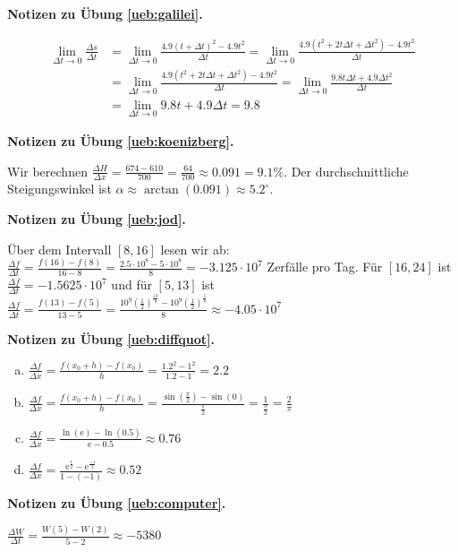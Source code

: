 \documentclass[%
11pt,%
twoside,%
titlepage,%
german,%
headsepline%
]{scrartcl}
\theoremstyle{definition}
\theoremstyle{plain}
\newcommand{\concatueb}[1]{ueb:#1}%
\newcommand{\concatlsg}[1]{lsg:#1}%
\newenvironment{lsg}[1]{%
    \par\noindent\textbf{Notizen zu Übung \ref{\concatueb{#1}}.}%
    \label{\concatlsg{#1}}
}{%
    \par%
}
\begin{document}
\begin{lsg}{galilei}
\begin{align*}
    \lim_{\Delta t\to0}\frac{\Delta s}{\Delta t} &= \lim_{\Delta t\to0}\frac{4.9(t+\Delta t)^2-4.9t^2}{\Delta t}=\lim_{\Delta t\to0}\frac{4.9(t^2+2t\Delta t+\Delta t^2)-4.9t^2}{\Delta t}\\
    &= \lim_{\Delta t\to0}\frac{4.9(t^2+2t\Delta t+\Delta t^2)-4.9t^2}{\Delta t}=\lim_{\Delta t\to0}\frac{9.8t\Delta t+4.9\Delta t^2}{\Delta t}\\
    &= \lim_{\Delta t\to0}9.8t+4.9\Delta t=9.8
\end{align*}
\end{lsg}
\begin{lsg}{koenizberg}
    Wir berechnen $\frac{\Delta H}{\Delta x}=\frac{674-610}{700}=\frac{64}{700}\approx0.091=9.1\%$. Der durchschnittliche Steigungswinkel ist $\alpha\approx\arctan(0.091)\approx5.2^\circ$.
\end{lsg}
\begin{lsg}{jod}
    Über dem Intervall $[8,16]$ lesen wir ab: $\frac{\Delta f}{\Delta t}=\frac{f(16)-f(8)}{16-8}=\frac{2.5\cdot10^8-5\cdot10^8}{8}=-3.125\cdot10^7$ Zerfälle pro Tag. Für $[16,24]$ ist $\frac{\Delta f}{\Delta t}=-1.5625\cdot10^7$ und für $[5,13]$ ist $\frac{\Delta f}{\Delta t}=\frac{f(13)-f(5)}{13-5}=\frac{10^9(\tfrac{1}{2})^\frac{13}{8}-10^9(\tfrac{1}{2})^\frac{5}{8}}{8}\approx -4.05\cdot10^7$
\end{lsg}
\begin{lsg}{diffquot}
    \begin{enumerate}[a)]
        \item $\frac{\Delta f}{\Delta x}=\frac{f(x_0+h)-f(x_0)}{h}=\frac{1.2^2-1^2}{1.2-1}=2.2$
        \item $\frac{\Delta f}{\Delta x}=\frac{f(x_0+h)-f(x_0)}{h}=\frac{\sin(\tfrac{\pi}{2})-\sin(0)}{\tfrac{\pi}{2}}=\frac{1}{\tfrac{\pi}{2}}=\frac{2}{\pi}$
        \item $\frac{\Delta f}{\Delta x}=\frac{\ln(\mathrm{e})-\ln(0.5)}{\mathrm{e}-0.5}\approx0.76$
        \item $\frac{\Delta f}{\Delta x}=\frac{\mathrm{e}^{\frac{1}{2}}-\mathrm{e}^{\frac{-1}{2}}}{1-(-1)}\approx0.52$
    \end{enumerate}
\end{lsg}
\begin{lsg}{computer}
    $\frac{\Delta W}{\Delta t}=\frac{W(5)-W(2)}{5-2}\approx-5380$
\end{lsg}

\clearpage
\end{document}
